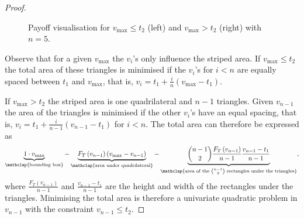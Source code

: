 \documentclass[11pt,a4paper]{article}
\numberwithin{equation}{section}
\begin{document}
\begin{proof}
\begin{figure}[!ht]
\begin{minipage}[b]{0.5\textwidth}
        \end{minipage}
        \caption{Payoff visualisation for $v_{\max}\le t_2$ (left) and $v_{\max}>t_2$ (right) with $n=5$.}
        \label{fig:uniform-threshold-payoff}
    \end{figure}
    
    Observe that for a given $v_{\max}$ the $v_i$'s only influence the striped area. If $v_{\max}\le t_2$ the total area of these triangles is minimised if the $v_i$'s for $i<n$ are equally spaced between $t_1$ and $v_{\max}$, that is, $v_i=t_1+\frac{i}{n}(v_{\max}-t_1)$. 

    If $v_{\max}> t_2$ the striped area is one quadrilateral and $n-1$ triangles. Given $v_{n-1}$ the area of the triangles is minimised if the other $v_i$'s have an equal spacing, that is, $v_i=t_1+\frac{i}{n-1}(v_{n-1}-t_1)$ for $i<n$. The total area can therefore be expressed as
    $$
    \underbrace{1\cdot v_{\max} }_{\mathclap{\text{bounding box}}}-
    \underbrace{F_{T}\left(v_{n-1}\right)\left(v_{\max}-v_{n-1}\right)}_{\mathclap{\text{area under quadrilateral}}}-
    \underbrace{\binom{n-1}{2}\frac{F_{T}\left(v_{n-1}\right)}{n-1}\frac{v_{n-1}-t_{1}}{n-1}}_{\mathclap{\text{area of the }\binom{n-1}{2}\text{ rectangles under the triangles}}},
    $$
    where $\frac{F_{T}\left(v_{n-1}\right)}{n-1}$ and $\frac{v_{n-1}-t_{1}}{n-1}$ are the height and width of the rectangles under the triangles.
    Minimising the total area is therefore a univariate quadratic problem in $v_{n-1}$ with the constraint $v_{n-1}\le t_2$.
    

\end{proof}
\end{document}
